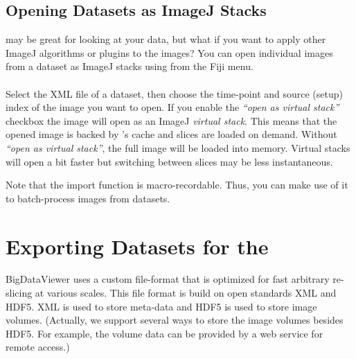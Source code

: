 \documentclass{scrartcl}
\begin{document}
\subsection{Opening \Bdv Datasets as ImageJ Stacks}
\Bdv may be great for looking at your data, but what if you want to apply other ImageJ algorithms or plugins to the images?
You can open individual images from a dataset as ImageJ stacks using  from the Fiji menu.
\\
\\
Select the XML file of a dataset, then choose the time-point and source (setup) index of the image you want to open.
If you enable the \emph{``open as virtual stack''} checkbox the image will open as an ImageJ \emph{virtual stack}.
This means that the opened image is backed by \bdv's cache and slices are loaded on demand.
Without \emph{``open as virtual stack''}, the full image will be loaded into memory.
Virtual stacks will open a bit faster but switching between slices may be less instantaneous.

Note that the import function is macro-recordable.
Thus, you can make use of it to batch-process images from \bdv datasets.


%
%
\section{Exporting Datasets for the \Bdv}

BigDataViewer uses a custom file-format that is optimized for fast arbitrary re-slicing at various scales.
This file format is build on open standards XML\cite{xml} and HDF5\cite{hdf5}.
XML is used to store meta-data and HDF5 is used to store image volumes.
(Actually, we support several ways to store the image volumes besides HDF5. For example, the volume data can be provided by a web service for remote access.)
\end{document}
